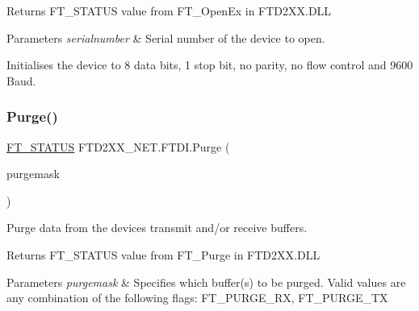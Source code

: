 \begin{DoxyReturn}{Returns}
F\+T\+\_\+\+S\+T\+A\+T\+US value from F\+T\+\_\+\+Open\+Ex in F\+T\+D2\+X\+X.\+D\+LL
\end{DoxyReturn}

\begin{DoxyParams}{Parameters}
{\em serialnumber} & Serial number of the device to open.\\
\hline
\end{DoxyParams}


Initialises the device to 8 data bits, 1 stop bit, no parity, no flow control and 9600 Baud.\mbox{\label{class_f_t_d2_x_x___n_e_t_1_1_f_t_d_i_ab30085b5c2261995546e07f38b30874d}} 
\subsubsection{\texorpdfstring{Purge()}{Purge()}}
{\footnotesize\ttfamily \mbox{\hyperlink{class_f_t_d2_x_x___n_e_t_1_1_f_t_d_i_aabe20ad905cc4ccc1e35dd5b877d9a83}{F\+T\+\_\+\+S\+T\+A\+T\+US}} F\+T\+D2\+X\+X\+\_\+\+N\+E\+T.\+F\+T\+D\+I.\+Purge (\begin{DoxyParamCaption}\item[{U\+Int32}]{purgemask }\end{DoxyParamCaption})}



Purge data from the devices transmit and/or receive buffers. 

\begin{DoxyReturn}{Returns}
F\+T\+\_\+\+S\+T\+A\+T\+US value from F\+T\+\_\+\+Purge in F\+T\+D2\+X\+X.\+D\+LL
\end{DoxyReturn}

\begin{DoxyParams}{Parameters}
{\em purgemask} & Specifies which buffer(s) to be purged. Valid values are any combination of the following flags\+: F\+T\+\_\+\+P\+U\+R\+G\+E\+\_\+\+RX, F\+T\+\_\+\+P\+U\+R\+G\+E\+\_\+\+TX\\
\hline
\end{DoxyParams}
\mbox{\label{class_f_t_d2_x_x___n_e_t_1_1_f_t_d_i_a22ce63b7b2e1de26473037f07b4d8045}} 
